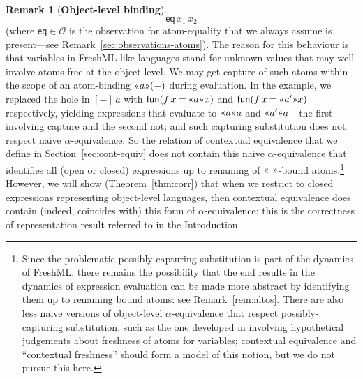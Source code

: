 \documentclass{LMCS}
\theoremstyle{plain}
\theoremstyle{definition}
\newtheorem{remark}[thm]{Remark}
\newcommand{\atm}[1][a]{#1}
\newcommand{\BINDVAL}[2]{\mathopen{\text{\normalfont\guillemotleft}}#1
  \mathclose{\text{\normalfont\guillemotright}}#2}
\newcommand{\EQ}{\mathbin{\kw{=}}}
\newcommand{\FUN}{\kw{fun}}
\newcommand{\kw}[1]{\mathsf{#1}}
\newcommand{\Obs}{\mathcal{O}}
\newcommand{\OBS}[1][obs]{\kw{#1}}
\newcommand{\vid}[1][x]{#1}
\begin{document}
\begin{remark}[\textbf{Object-level binding}]
\[  \OBS[eq]\,\vid_1\,\vid_2
  \]
  (where $\OBS[eq]\in\Obs$ is the observation for atom-equality that
  we always assume is present---see
  Remark~\ref{sec:observations-atoms}). The reason for this behaviour
  is that variables in FreshML-like languages stand for unknown values
  that may well involve atoms free at the object level. We may get
  capture of such atoms within the scope of an atom-binding
  $\BINDVAL{\atm}{(-)}$ during evaluation.  In the example, we
  replaced the hole in $[-]\,\atm$ with
  $\FUN(\vid[f]\,\vid\EQ\BINDVAL{\atm}{\vid})$ and
  $\FUN(\vid[f]\,\vid\EQ\BINDVAL{\atm'}{\vid})$ respectively, yielding
  expressions that evaluate to $\BINDVAL{\atm}{\atm}$ and
  $\BINDVAL{\atm'}{\atm}$---the first involving capture and the second
  not; and such capturing substitution does not respect naive
  $\alpha$-equivalence. So the relation of contextual equivalence that
  we define in Section~\ref{sec:cont-equiv} does not contain this
  naive $\alpha$-equivalence that identifies all (open or closed)
  expressions up to renaming of $\BINDVAL{\ }{}$-bound
  atoms.\footnote{Since the problematic possibly-capturing
    substitution is part of the dynamics of FreshML, there remains the
    possibility that the end results in the dynamics of expression
    evaluation can be made more abstract by identifying them up to
    renaming bound atoms: see Remark~\ref{rem:altos}. There are also
    less naive versions of object-level $\alpha$-equivalence that
    respect possibly-capturing substitution, such as the one developed
    in \cite{PittsAM:nomu-jv} involving hypothetical judgements about
    freshness of atoms for variables; contextual equivalence and
    ``contextual freshness'' should form a model of this notion, but
    we do not pursue this here.}  However, we will show
  (Theorem~\ref{thm:corr}) that when we restrict to closed expressions
  representing object-level languages, then contextual equivalence
  does contain (indeed, coincides with) this form of
  $\alpha$-equivalence: this is the correctness of representation
  result referred to in the Introduction.
\end{remark}
\end{document}
